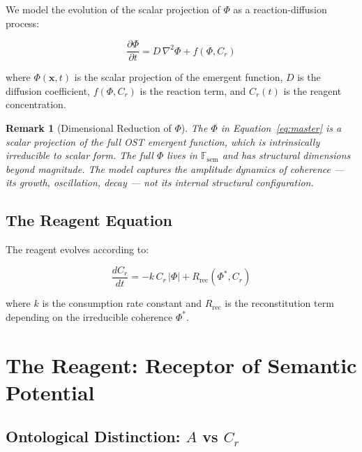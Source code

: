\documentclass[12pt,a4paper]{article}
\newtheorem*{remark}{Remark}
\newcommand{\reag}{C_r}
\newcommand{\Phistar}{\Phi^{*}}
\newcommand{\Mpot}{A}
\newcommand{\Fsem}{\mathbb{F}_{\mathrm{sem}}}
\begin{document}
We model the evolution of the scalar projection of $\Phi$ as a reaction-diffusion process:

\begin{equation}\label{eq:master}
\frac{\partial \Phi}{\partial t} = D\,\nabla^2 \Phi + f(\Phi, \reag)
\end{equation}

\noindent where $\Phi(\mathbf{x}, t)$ is the scalar projection of the emergent function, $D$ is the diffusion coefficient, $f(\Phi, \reag)$ is the reaction term, and $\reag(t)$ is the reagent concentration.

\begin{remark}[Dimensional Reduction of $\Phi$]
\label{rem:phi_reduction}
The $\Phi$ in Equation~\eqref{eq:master} is a scalar projection of the full OST emergent function, which is intrinsically irreducible to scalar form. The full $\Phi$ lives in $\Fsem$ and has structural dimensions beyond magnitude. The model captures the \emph{amplitude dynamics} of coherence --- its growth, oscillation, decay --- not its internal structural configuration.
\end{remark}

\subsection{The Reagent Equation}

The reagent evolves according to:

\begin{equation}\label{eq:reagent}
\frac{d\reag}{dt} = -k\,\reag\,|\Phi| + R_{\mathrm{rec}}(\Phistar, \reag)
\end{equation}

\noindent where $k$ is the consumption rate constant and $R_{\mathrm{rec}}$ is the reconstitution term depending on the irreducible coherence $\Phistar$.


\section{The Reagent: Receptor of Semantic Potential}\label{sec:reagent}

\subsection{Ontological Distinction: $\Mpot$ vs $\reag$}
\end{document}
